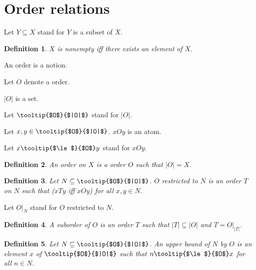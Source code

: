 \documentclass{article}
\newcommand{\rest}[2]{#1 \vert_{#2}}
\newcommand{\oC}[1]{#1}
\newcommand{\oO}[1]{\mbox{\tooltip{$\le$}{$#1$}}}
\newcommand{\oBC}[1]{\vert #1 \vert}
\newcommand{\oB}[1]{\mbox{\tooltip{$#1$}{$|#1|$}}}
\newtheorem*{definition}{Definition}
\begin{document}
\section{Order relations}
\begin{forthel}
	Let $Y \subseteq X$ stand for $Y$ is a subset of $X$.
	\begin{definition}
		$X$ is nonempty iff there exists an element of $X$.
	\end{definition}
	\begin{signature}
		An order is a notion.
	\end{signature}
	Let $O$ denote a order.
	\begin{signature}
		$\oBC{O}$ is a set.
	\end{signature}
	Let $\oB{O}$ stand for $\oBC{O}$.
	
	\begin{signature}
		Let $x,y \in \oB{O}$.  $x \oC{O} y$ is an atom.
	\end{signature}
	Let $x \oO{O} y$ stand for $x \oC{O} y$.
\end{forthel}
\begin{forthel}
	\begin{definition}
		An order on $X$ is a order $O$ such that $\oBC{O} = X$.
	\end{definition}
	\begin{definition}
		Let $N \subseteq \oB{O}$. $O$ restricted to $N$ is an order $T$ on $N$ such that
		($x \oC{T} y$ iff $x \oC{O} y$) for all $x,y \in N$.
	\end{definition}
	Let $\rest{O}{N}$ stand for $O$ restricted to $N$.
	\begin{definition}
		A suborder of $O$ is an order $T$ such that $\oBC{T} \subseteq  \oBC{O}$ and $T = \rest{O}{\oBC{T}}$.
	\end{definition}
	\begin{definition}
		Let $N \subseteq \oB{O}$. An upper bound of $N$ by $O$ is an element $x$ of $\oB{O}$ such that $n \oO{O} x$ for all 
		$n \in N$.
	\end{definition}
\end{forthel}
\end{document}
